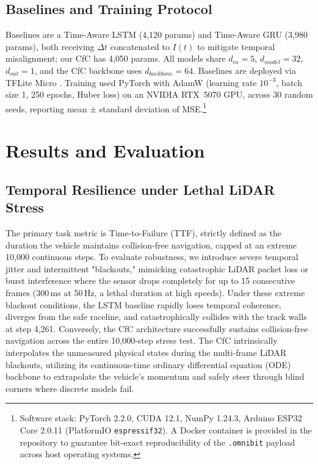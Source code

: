 \documentclass[conference]{IEEEtran}
\begin{document}
\subsection{Baselines and Training Protocol}
Baselines are a Time-Aware LSTM (4{,}120 params) and Time-Aware GRU (3{,}980 params), both receiving $\Delta t$ concatenated to $I(t)$ to mitigate temporal misalignment; our CfC has 4{,}050 params. All models share $d_{in}=5$, $d_{model}=32$, $d_{out}=1$, and the CfC backbone uses $d_{backbone}=64$. Baselines are deployed via TFLite Micro \cite{david2021tflitemicro}. Training used PyTorch with AdamW \cite{kingma2014adam,loshchilov2019adamw} (learning rate $10^{-3}$, batch size 1, 250 epochs, Huber loss) on an NVIDIA RTX~5070 GPU, across 30 random seeds, reporting mean $\pm$ standard deviation of MSE.\footnote{Software stack: PyTorch 2.2.0, CUDA 12.1, NumPy 1.24.3, Arduino ESP32 Core 2.0.11 (PlatformIO \texttt{espressif32}). A Docker container is provided in the repository to guarantee bit-exact reproducibility of the \texttt{.omnibit} payload across host operating systems.}

\section{Results and Evaluation}
\subsection{Temporal Resilience under Lethal LiDAR Stress}
The primary task metric is Time-to-Failure (TTF), strictly defined as the duration the vehicle maintains collision-free navigation, capped at an extreme 10,000 continuous steps. To evaluate robustness, we introduce severe temporal jitter and intermittent "blackouts," mimicking catastrophic LiDAR packet loss or burst interference where the sensor drops completely for up to 15 consecutive frames (300\,ms at 50\,Hz, a lethal duration at high speeds). Under these extreme blackout conditions, the LSTM baseline rapidly loses temporal coherence, diverges from the safe raceline, and catastrophically collides with the track walls at step 4,261. Conversely, the CfC architecture successfully sustains collision-free navigation across the entire 10,000-step stress test. The CfC intrinsically interpolates the unmeasured physical states during the multi-frame LiDAR blackouts, utilizing its continuous-time ordinary differential equation (ODE) backbone to extrapolate the vehicle's momentum and safely steer through blind corners where discrete models fail.
\end{document}
